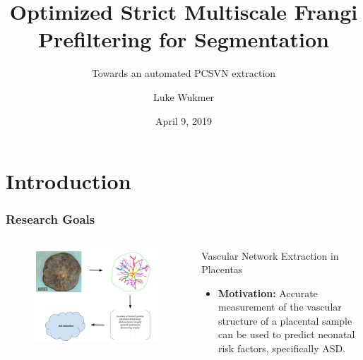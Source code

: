 \documentclass[9pt,notes]{beamer}
\title[Cake Defense]{Optimized Strict Multiscale Frangi Prefiltering for Segmentation}
\subtitle{Towards an automated PCSVN extraction}
\author[{Luke Wukmer}] %
{{Luke Wukmer}}%
\institute[CSULB] %
{
  Advisor: Dr. Jen-Mei Chang\\
  Department of Mathematics and Statistics\\
  California State University, Long Beach\\
  \texttt{lwukmer@gmail.com}
}
\date{April 9, 2019}
\begin{document}
\begin{frame} %
  \titlepage
\end{frame}

\section{Introduction}
\begin{frame} %
	\frametitle{Research Goals}
	\begin{columns}[c]
		\begin{column}{0.5\textwidth}
			\begin{figure}
			\includegraphics[width=\textwidth]{general_research_question.png}
			\end{figure}
		\end{column}
		\begin{column}{0.5\textwidth}
			\begin{block}{Vascular Network Extraction in Placentas}
				\begin{itemize}
					\item \textbf{Motivation:}
            Accurate measurement of the vascular structure of a placental sample
            can be used to predict neonatal risk factors, specifically ASD.

\end{itemize}
\end{block}
\end{column}
\end{columns}
\end{frame}
\end{document}
